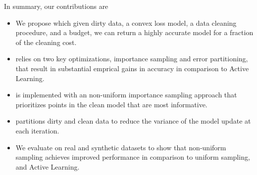 In summary, our contributions are
\begin{itemize}[noitemsep]
\item We propose \sysfull which given dirty data, a convex loss model, a data cleaning procedure, and a budget, we can return a highly accurate model for a fraction of the cleaning cost.
\item \sys relies on two key optimizations, importance sampling and error partitioning, that result in substantial emprical gains in accuracy in comparison to Active Learning.
\item \sys is implemented with an non-uniform importance sampling approach that prioritizes points in the clean model that are most informative.
\item \sys partitions dirty and clean data to reduce the variance of the model update at each iteration.
\item We evaluate \sysfull on real and synthetic datasets to show that non-uniform sampling achieves improved performance in comparison to uniform sampling, and Active Learning.
\end{itemize}








